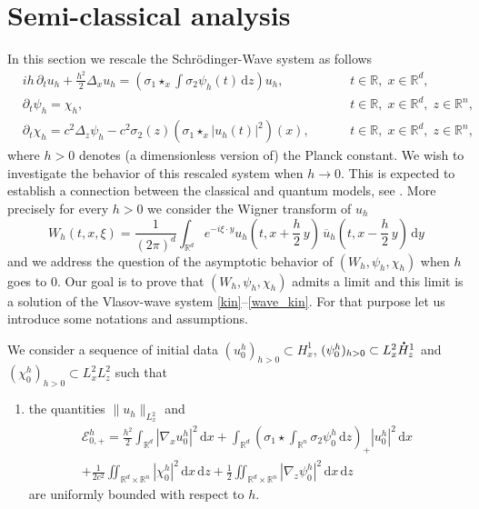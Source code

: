 \documentclass[10pt]{amsart}
\let\bar\oldbar
\theoremstyle{definition}
\newcommand*{\overbigdot}[1]{%
\accentset{\mbox{\large\bfseries .}}{#1}}
\let\bar\overline
\newcommand{\R}{\mathbb{R}}
\let\ds\displaystyle
\newcommand{\ud}{\, {\mathrm{d}}}
\begin{document}
\section{Semi-classical analysis}\label{SClassicalAnalysis}

In this section we rescale the Schrödinger-Wave system as follows
\begin{subequations}
\begin{alignat}{11}
\label{schroh}&\ds ih\,\partial_{t}u_{h}+\frac{h^{2}}{2}\Delta_{x}u_{h}=\left(\sigma_{1}\star_{x}\int\sigma_{2}\psi_{h}(t)\ud z\right)u_{h},&\hspace{1cm}t\in\R,\;x\in\R^{d},\\
\label{wave1_schroh}&\ds \partial_{t}\psi_{h}=\chi_{h},&\hspace{1cm}t\in\R,\;x\in\R^{d},\;z\in\R^{n},\\
\label{wave2_schroh}&\ds \partial_{t}\chi_{h}=c^{2}\Delta_{z}\psi_{h}-c^{2}\sigma_{2}(z)\left(\sigma_{1}\star_{x}|u_{h}(t)|^{2}\right)(x),&\hspace{1cm}t\in\R,\;x\in\R^{d},\;z\in\R^{n},
\end{alignat}
\end{subequations}
where $h>0$ denotes (a dimensionless version of) the Planck constant.
We wish to investigate the behavior of this rescaled system when $h\to 0$. This is expected to establish a connection between the classical and quantum models, see \cite{Lions_Paul_Wigner}. More precisely for every $h>0$ we consider the Wigner transform of $u_{h}$
\[
W_{h}(t,x,\xi)=\frac{1}{(2\pi)^{d}}\int_{\R^{d}}e^{-i\xi\cdot y}u_{h}(t,x+\frac{h}{2}\,y)\,\bar{u}_{h}(t,x-\frac{h}{2}\,y)\ud y
\]
and we address the question of the asymptotic behavior of $(W_{h},\psi_{h},\chi_{h})$ when $h$ goes to $0$. Our goal is to prove that $(W_{h},\psi_{h},\chi_{h})$ admits a limit and this limit is a solution of the Vlasov-wave system \eqref{kin}--\eqref{wave_kin}. For that purpose let us introduce some notations and assumptions.

We consider a sequence of initial data $(u_{0}^{h})_{h>0}\subset H_{x}^{1}$, $(\psi_{0}^{h})_{h>0}\subset L_{x}^{2}\overbigdot{H}_{z}^{1}$ and $(\chi_{0}^{h})_{h>0}\subset L_{x}^{2}L_{z}^{2}$ such that

\begin{enumerate}\renewcommand{\theenumi}{H\arabic{enumi}}\setcounter{enumi}{4}
\item\label{h5}
the quantities $\|u_{h}\|_{L_{x}^{2}}$ and
\begin{multline*}
\mathscr{E}_{0,+}^{h}=\frac{h^{2}}{2}\int_{\R^{d}}|\nabla_{x}u_{0}^{h}|^{2}\ud x+\int_{\R^{d}}\left(\sigma_{1}\star\int_{\R^{n}}\sigma_{2}\psi_{0}^{h}\ud z\right)_{+}|u_{0}^{h}|^{2}\ud x\\
+\frac{1}{2c^{2}}\iint_{\R^{d}\times\R^{n}}|\chi_{0}^{h}|^{2}\ud x\ud z+\frac{1}{2}\iint_{\R^{d}\times\R^{n}}|\nabla_{z}\psi_{0}^{h}|^{2}\ud x\ud z
\end{multline*}
are uniformly bounded with respect to $h$.
\end{enumerate}
\end{document}
